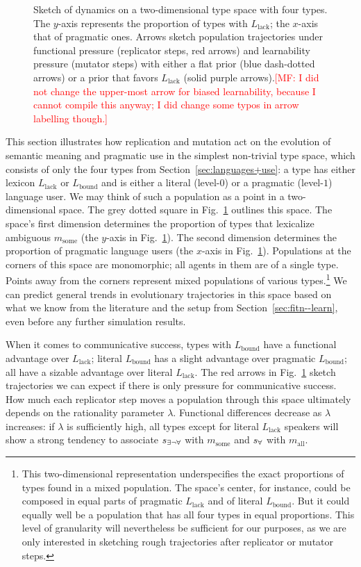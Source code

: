 \documentclass[a4paper, 11pt]{article}
\theoremstyle{Satz}
\newcommand{\mf}[1]{\textcolor{Red}{[MF: #1]}}
\newcommand{\state}{\ensuremath{s}\xspace}		%
\newcommand{\mystate}[1]{\ensuremath{\state_{\text{#1}}}\xspace} %
\newcommand{\mylang}[1]{\ensuremath{L_{\text{#1}}}\xspace} %
\newcommand{\messg}{\ensuremath{m}\xspace}		%
\newcommand{\mymessg}[1]{\ensuremath{\messg_{\text{#1}}}\xspace} %
\newcommand{\ssome}{\mystate{\ensuremath{\exists\neg\forall}}}
\newcommand{\sall}{\mystate{\ensuremath{\forall}}}
\newcommand{\msome}{\mymessg{some}}
\newcommand{\mall}{\mymessg{all}}
\newcommand{\Lbound}{\mylang{bound}}
\newcommand{\Llack}{\mylang{lack}}
\begin{document}
\begin{figure}
\caption{Sketch of dynamics on a two-dimensional type space with four types. The $y$-axis
  represents the proportion of types with $\Llack$; the $x$-axis that of pragmatic ones. Arrows
  sketch population trajectories under functional pressure (replicator steps, red arrows) and
  learnability pressure (mutator steps) with either a flat prior (blue dash-dotted arrows) or a
  prior that favors $\Llack$ (solid purple arrows).\mf{I did not change the upper-most arrow
    for biased learnability, because I cannot compile this anyway; I did change some typos in
    arrow labelling though.}}
\label{fig:sketch}
\end{figure}

This section illustrates how replication and mutation act on the evolution of semantic meaning
and pragmatic use in the simplest non-trivial type space, which consists of only the four types
from Section~\ref{sec:languages+use}: a type has either lexicon $\Llack$ or $\Lbound$ and is
either a literal (level-$0$) or a pragmatic (level-$1$) language user. We may think of such a
population as a point in a two-dimensional space. The grey dotted square in
Fig.~\ref{fig:sketch} outlines this space. The space's first dimension determines the
proportion of types that lexicalize ambiguous $\msome$ (the $y$-axis in
Fig.~\ref{fig:sketch}). The second dimension determines the proportion of pragmatic language
users (the $x$-axis in Fig.~\ref{fig:sketch}). Populations at the corners of this space are
monomorphic; all agents in them are of a single type. Points away from the corners represent
mixed populations of various types.\footnote{This two-dimensional representation underspecifies
  the exact proportions of types found in a mixed population. The space's center, for instance,
  could be composed in equal parts of pragmatic $\Llack$ and of literal $\Lbound$. But it could
  equally well be a population that has all four types in equal proportions. This level of
  granularity will nevertheless be sufficient for our purposes, as we are only interested in
  sketching rough trajectories after replicator or mutator steps.} We can predict general
trends in evolutionary trajectories in this space based on what we know from the literature and
the setup from Section~\ref{sec:fitn--learn}, even before any further simulation results.

When it comes to communicative success, types with $\Lbound$ have a functional advantage over
$\Llack$; literal $\Lbound$ has a slight advantage over pragmatic $\Lbound$; all have a sizable
advantage over literal $\Llack$. The red arrows in Fig.~\ref{fig:sketch} sketch trajectories we
can expect if there is only pressure for communicative success. How much each replicator step
moves a population through this space ultimately depends on the rationality parameter
$\lambda$. Functional differences decrease as $\lambda$ increases: if $\lambda$ is sufficiently
high, all types except for literal $\Llack$ speakers will show a strong tendency to associate
$\ssome$ with $\msome$ and $\sall$ with $\mall$.
\end{document}
